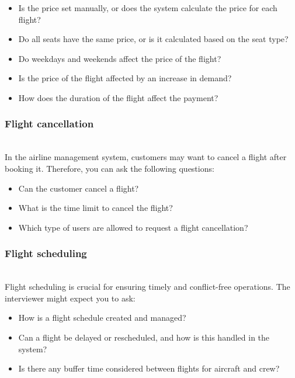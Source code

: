\begin{itemize}
\item
Is the price set manually, or does the system calculate the price for each flight?
\item
Do all seats have the same price, or is it calculated based on the seat type?
\item
Do weekdays and weekends affect the price of the flight?
\item
Is the price of the flight affected by an increase in demand?
\item
How does the duration of the flight affect the payment?
\end{itemize}

\subsubsection{Flight cancellation}\label{-zL_WWOLPzBEZtlfVs172}
\\
In the airline management system, customers may want to cancel a flight after booking it. Therefore, you can ask the following questions:

\begin{itemize}
\item
\protect{}\label{M0daI0KAMljqeZRkZWL-v}
Can the customer cancel a flight?
\item
\protect{}\label{okI6-u03zPazrAcR0KC7u}
What is the time limit to cancel the flight?
\item
\protect{}\label{PfSrKQ0T0PGC3Q6cd86LY}
Which type of users are allowed to request a flight cancellation?
\end{itemize}

\subsubsection{Flight scheduling}\label{zHDdi0HPuBmiiKtD25-OQ}
\\
Flight scheduling is crucial for ensuring timely and conflict-free operations. The interviewer might expect you to ask:

\begin{itemize}
\item
\protect{}\label{FxlmLlbRg0HsJ9khpFAP2}
How is a flight schedule created and managed?
\item
\protect{}\label{PT3D7PZ3EGW2pXGyKBAKU}
Can a flight be delayed or rescheduled, and how is this handled in the system?
\item
\protect{}\label{2WgpY1kwWcmGWcVq1-TeH}
Is there any buffer time considered between flights for aircraft and crew?
\end{itemize}


